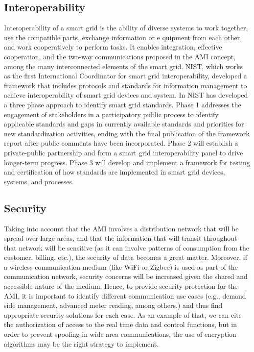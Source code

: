 \documentclass[11pt,final,onecolumn]{IEEEtran}
\begin{document}
\subsection{Interoperability}
Interoperability of a smart grid is the ability of diverse systems to work together, use the compatible parts, exchange information or e quipment from each other, and work cooperatively to perform tasks. It enables integration, effective cooperation, and the two-way communications proposed in the AMI concept, among the many interconnected elements of the smart grid. NIST, which works as the first International Coordinator for smart grid interoperability, developed a framework that includes protocols and standards for information management to achieve interoperability of smart grid devices and system. In \cite{NIST2010} NIST has developed a three phase approach to identify smart grid standards. Phase 1 addresses the engagement of stakeholders in a participatory public process to identify applicable standards and gaps in currently available standards and priorities for new standardization activities, ending with the final publication of the framework report after public comments have been incorporated. Phase 2 will establish a private-public partnership and form a smart grid interoperability panel to drive longer-term progress. Phase 3 will develop and implement a framework for testing and certification of how standards are implemented in smart grid devices, systems, and processes.

\subsection{Security}
Taking into account that the AMI involves a distribution network that will be spread over large areas, and that the information that will transit throughout that network will be sensitive (as it can involve patterns of consumption from the customer, billing, etc.), the security of data becomes a great matter. Moreover, if a wireless communication medium (like WiFi or Zigbee) is used as part of the communication network, security concerns will be increased given the shared and accessible nature of the medium. Hence, to provide security protection for the AMI, it is important to identify different communication use cases (e.g., demand side management, advanced meter reading, among others.) and thus find appropriate security solutions for each case. As an example of that, we can cite the authorization of access to the real time data and control functions, but in order to prevent spoofing in wide area communications, the use of encryption algorithms may be the right strategy to implement. 
\end{document}

